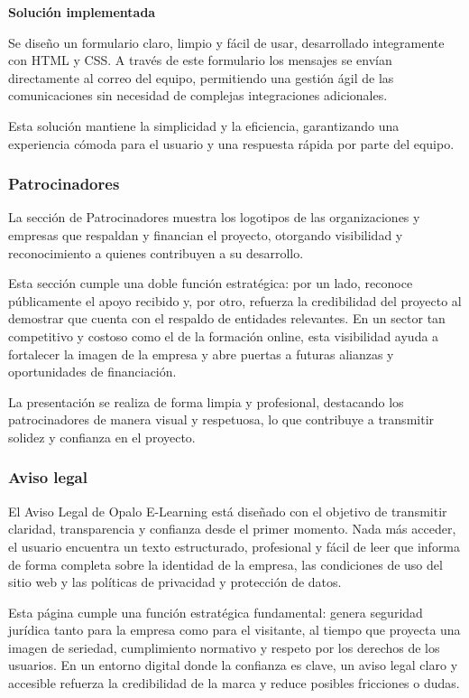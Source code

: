 \documentclass[11.5pt]{article}
\begin{document}
	\noindent\textbf{{\large Solución implementada}}
	
	Se diseño un formulario claro, limpio y fácil de usar, desarrollado integramente con HTML y CSS. A través de este formulario los mensajes se envían directamente al correo del equipo, permitiendo una gestión ágil de las comunicaciones sin necesidad de complejas integraciones adicionales.
	
	Esta solución mantiene la simplicidad y la eficiencia, garantizando una experiencia cómoda para el usuario y una respuesta rápida por parte del equipo.
	
	\subsubsection{Patrocinadores}
	
	La sección de Patrocinadores muestra los logotipos de las organizaciones y empresas que respaldan y financian el proyecto, otorgando visibilidad y reconocimiento a quienes contribuyen a su desarrollo.
	
	Esta sección cumple una doble función estratégica: por un lado, reconoce públicamente el apoyo recibido y, por otro, refuerza la credibilidad del proyecto al demostrar que cuenta con el respaldo de entidades relevantes. En un sector tan competitivo y costoso como el de la formación online, esta visibilidad ayuda a fortalecer la imagen de la empresa y abre puertas a futuras alianzas y oportunidades de financiación.
	
	La presentación se realiza de forma limpia y profesional, destacando los patrocinadores de manera visual y respetuosa, lo que contribuye a transmitir solidez y confianza en el proyecto.
	
	\subsubsection{Aviso legal}
	
	El Aviso Legal de Opalo E-Learning está diseñado con el objetivo de transmitir claridad, transparencia y confianza desde el primer momento. Nada más acceder, el usuario encuentra un texto estructurado, profesional y fácil de leer que informa de forma completa sobre la identidad de la empresa, las condiciones de uso del sitio web y las políticas de privacidad y protección de datos.
	
	Esta página cumple una función estratégica fundamental: genera seguridad jurídica tanto para la empresa como para el visitante, al tiempo que proyecta una imagen de seriedad, cumplimiento normativo y respeto por los derechos de los usuarios. En un entorno digital donde la confianza es clave, un aviso legal claro y accesible refuerza la credibilidad de la marca y reduce posibles fricciones o dudas.
	
\end{document}
